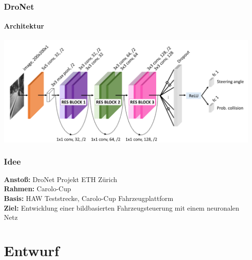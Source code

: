 \documentclass{beamer}
\begin{document}
\begin{frame}
\frametitle{DroNet}
\framesubtitle{Architektur}
\includegraphics[width=\linewidth]{figures/Architecture-DRONET.png}	
\end{frame}


\begin{frame}
\frametitle{Idee}

\textbf{Anstoß:} DroNet Projekt ETH Zürich \\

\textbf{Rahmen:} Carolo-Cup\\

\textbf{Basis:} HAW Teststrecke, Carolo-Cup Fahrzeugplattform\\

\textbf{Ziel:} Entwicklung einer bildbasierten Fahrzeugsteuerung mit einem neuronalen Netz



\end{frame}


\section{Entwurf}
\frame{\tableofcontents[currentsection]}
\end{document}
